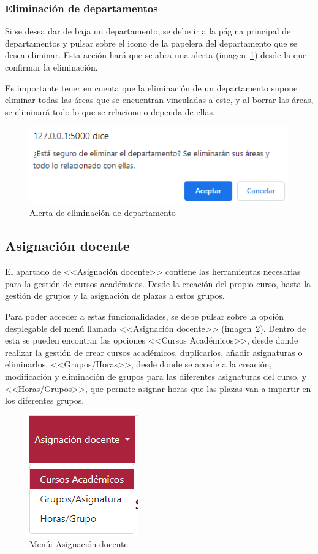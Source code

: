 \subsubsection{Eliminación de departamentos}
Si se desea dar de baja un departamento, se debe ir a la página principal de departamentos y pulsar sobre el icono de la papelera del departamento que se desea eliminar.
Esta acción hará que se abra una alerta (imagen~\ref{pag:alertElDepartamento}) desde la que confirmar la eliminación.

Es importante tener en cuenta que la eliminación de un departamento supone eliminar todas las áreas que se encuentran vinculadas a este, y al borrar las áreas, se eliminará todo lo que se relacione o dependa de ellas.

\begin{figure}
	\centering
	\includegraphics[width=.6\textwidth]{../img/Anexos/Manual usuario/alertElDepartamento.png}
	\caption{Alerta de eliminación de departamento}\label{pag:alertElDepartamento}
\end{figure}

\subsection{Asignación docente}
El apartado de <<Asignación docente>> contiene las herramientas necesarias para la gestión de cursos académicos.
Desde la creación del propio curso, hasta la gestión de grupos y la asignación de plazas a estos grupos.

Para poder acceder a estas funcionalidades, se debe pulsar sobre la opción desplegable del menú llamada <<Asignación docente>> (imagen~\ref{pag:menuAsigDoc}).
Dentro de esta se pueden encontrar las opciones <<Cursos Académicos>>, desde donde realizar la gestión de crear cursos académicos, duplicarlos, añadir asignaturas o eliminarlos, <<Grupos/Horas>>, desde donde se accede a la creación, modificación y eliminación de grupos para las diferentes asignaturas del curso, y <<Horas/Grupos>>, que permite asignar horas que las plazas van a impartir en los diferentes grupos.

\begin{figure}
	\centering
	\includegraphics[width=.4\textwidth]{../img/Anexos/Manual usuario/menu asg doc.png}
	\caption{Menú: Asignación docente}\label{pag:menuAsigDoc}
\end{figure}

